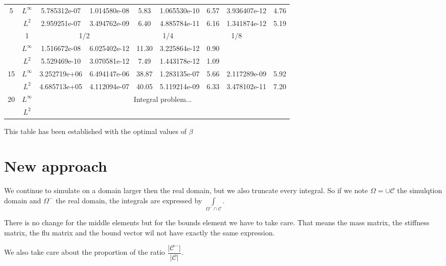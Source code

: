 \documentclass[a4paper,10pt]{article}
\begin{document}
\begin{table}[!h]
{\begin{tabular}{|c|c|c|c|c|c|c|c|c|}
\multirow{2}{*}{5} & $L^\infty$ & 5.785312e-07 & 1.014580e-08 & 5.83 & 
1.065530e-10 & 6.57 & 3.936407e-12 & 4.76 \\ \cline{2-9} 
 & $L^2$ & 2.959251e-07 & 3.494762e-09 & 6.40 & 4.885784e-11 & 6.16 & 
1.341874e-12 & 5.19 \\ \hhline{|==|=|==|==|==|}
\multicolumn{2}{|c|}{$\Delta x$} & 1 & \multicolumn{2}{c|}{1/2} & 
\multicolumn{2}{c|}{1/4} & \multicolumn{2}{c|}{1/8} \\ \hhline{|==|=|==|==|==|}
\multirow{2}{*}{10} & $L^\infty$ & 1.516672e-08 & 6.025402e-12 & 11.30 & 
3.225864e-12 & 0.90 & \multicolumn{2}{c|}{\multirow{2}{*}{}} \\ \cline{2-7}
 & $L^2$ & 5.529469e-10 & 3.070581e-12 & 7.49 & 1.443178e-12 & 1.09 & 
\multicolumn{2}{c|}{} \\ \hline
\multirow{2}{*}{15} & $L^\infty$ & 3.252719e+06 & 6.494147e-06 & 38.87 & 
1.283135e-07 & 5.66 & 2.117289e-09 & 5.92 \\ \cline{2-9} 
 & $L^2$ & 4.685713e+05 & 4.112094e-07 & 40.05 & 5.119214e-09 & 6.33 & 
3.478102e-11 & 7.20 \\ \hline
\multirow{2}{*}{20} & $L^\infty$ & \multicolumn{7}{c|}{\multirow{2}{*}{Integral 
problem...}} \\ \cline{2-2}
 & $L^2$ & \multicolumn{7}{c|}{} \\ \hline
\end{tabular}%
}
\end{table}

This table has been established with the optimal values of $\beta$


\clearpage

\section{New approach}

We continue to simulate on a domain larger then the real domain, but we also 
truncate every integral. So if we note $\Omega = \cup \mathcal{C}$ the 
simulqtion domain and $\Omega^-$ the real domain, the integrals are expressed 
by $\int\limits_{\Omega^- \cap \mathcal{C}}$.

There is no change for the middle elements but for the bounds element we have 
to take care. That means the mass matrix, the stiffness matrix, the flu matrix 
and the bound vector wil not have exactly the same expression.

We also take care about the proportion of the ratio 
$\dfrac{|\mathcal{C}^-|}{|\mathcal{C}|}$.
\end{document}
